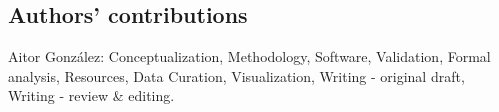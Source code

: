 \begin{backmatter}
\section*{Authors' contributions}
Aitor González: Conceptualization, Methodology, Software, Validation, Formal analysis, Resources, Data Curation, Visualization, Writing - original draft, Writing - review \& editing.







\end{backmatter}
